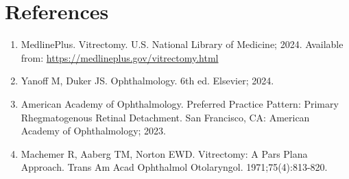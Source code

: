 \section*{References}
\begin{enumerate}
  \item MedlinePlus. Vitrectomy. U.S. National Library of Medicine; 2024. Available from: \url{https://medlineplus.gov/vitrectomy.html}
  
  \item Yanoff M, Duker JS. Ophthalmology. 6th ed. Elsevier; 2024.
  
  \item American Academy of Ophthalmology. Preferred Practice Pattern: Primary Rhegmatogenous Retinal Detachment. San Francisco, CA: American Academy of Ophthalmology; 2023.
  
  \item Machemer R, Aaberg TM, Norton EWD. Vitrectomy: A Pars Plana Approach. Trans Am Acad Ophthalmol Otolaryngol. 1971;75(4):813-820.
\end{enumerate}

\clearpage
